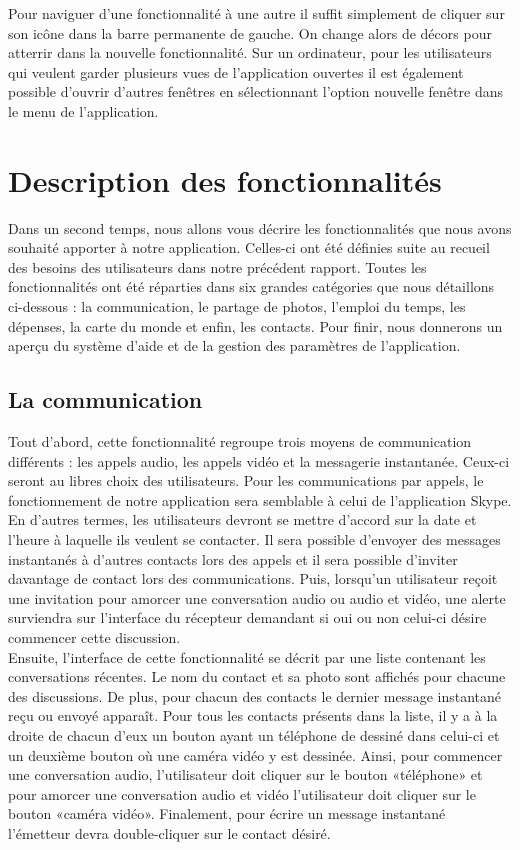 \documentclass[11pt]{article}
\begin{document}
Pour naviguer d'une fonctionnalité à une autre il suffit simplement de cliquer sur son icône dans la barre permanente de gauche. On change alors de décors pour atterrir dans la nouvelle fonctionnalité. Sur un ordinateur, pour les utilisateurs qui veulent garder plusieurs vues de l'application ouvertes il est également possible d'ouvrir d'autres fenêtres en sélectionnant l'option nouvelle fenêtre dans le menu de l'application.

\section{Description des fonctionnalités}
Dans un second temps, nous allons vous décrire les fonctionnalités que nous avons souhaité apporter à notre application. Celles-ci ont été définies suite au recueil des besoins des utilisateurs dans notre précédent rapport. Toutes les fonctionnalités ont été réparties dans six grandes catégories que nous détaillons ci-dessous : la communication, le partage de photos, l'emploi du temps, les dépenses, la carte du monde et enfin, les contacts. Pour finir, nous donnerons un aperçu du système d'aide et de la gestion des paramètres de l'application.
\subsection{La communication}\label{par:com}
	Tout d’abord, cette fonctionnalité regroupe trois moyens de communication différents : les appels audio, les appels vidéo et la messagerie instantanée. Ceux-ci seront au libres  choix des utilisateurs. Pour les communications par appels, le fonctionnement de notre application sera semblable à celui de l’application Skype. En d’autres termes, les utilisateurs devront se mettre d’accord sur la date et l’heure à laquelle ils veulent se contacter. Il sera possible d’envoyer des messages instantanés à d’autres contacts lors des appels  et il sera possible d'inviter davantage de contact lors des communications. Puis, lorsqu’un utilisateur reçoit une invitation pour amorcer une conversation audio ou audio et vidéo, une alerte surviendra sur l’interface du récepteur demandant si oui ou non celui-ci désire commencer cette discussion. ~\\
	
	Ensuite, l’interface de cette fonctionnalité se décrit par une liste contenant les conversations récentes. Le nom du contact et sa photo sont affichés pour chacune des discussions. De plus, pour chacun des contacts le dernier message instantané reçu ou envoyé apparaît. Pour tous les contacts présents dans la liste, il y a à la droite de chacun d’eux un bouton ayant un téléphone de dessiné dans celui-ci et un deuxième bouton où une caméra vidéo y est dessinée. Ainsi, pour commencer une conversation audio, l’utilisateur doit cliquer sur le bouton «téléphone» et pour amorcer une conversation audio et vidéo l’utilisateur doit cliquer sur le bouton «caméra vidéo». Finalement, pour écrire un message instantané l’émetteur devra double-cliquer sur le contact désiré.
\end{document}
